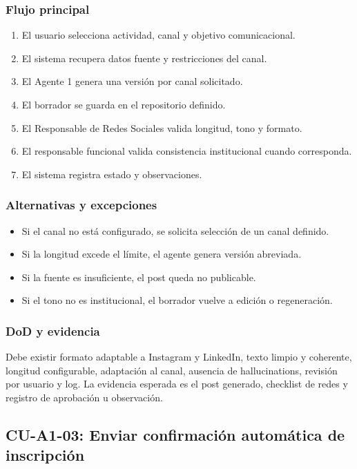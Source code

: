 \documentclass[11pt,a4paper]{article}
\begin{document}
\subsubsection{Flujo principal}

\begin{enumerate}
  \item El usuario selecciona actividad, canal y objetivo comunicacional.
  \item El sistema recupera datos fuente y restricciones del canal.
  \item El Agente 1 genera una versión por canal solicitado.
  \item El borrador se guarda en el repositorio definido.
  \item El Responsable de Redes Sociales valida longitud, tono y formato.
  \item El responsable funcional valida consistencia institucional cuando corresponda.
  \item El sistema registra estado y observaciones.
\end{enumerate}

\subsubsection{Alternativas y excepciones}

\begin{itemize}
  \item Si el canal no está configurado, se solicita selección de un canal definido.
  \item Si la longitud excede el límite, el agente genera versión abreviada.
  \item Si la fuente es insuficiente, el post queda no publicable.
  \item Si el tono no es institucional, el borrador vuelve a edición o regeneración.
\end{itemize}

\subsubsection{DoD y evidencia}

Debe existir formato adaptable a Instagram y LinkedIn, texto limpio y coherente, longitud configurable, adaptación al canal, ausencia de hallucinations, revisión por usuario y log. La evidencia esperada es el post generado, checklist de redes y registro de aprobación u observación.

\subsection{CU-A1-03: Enviar confirmación automática de inscripción}
\end{document}
